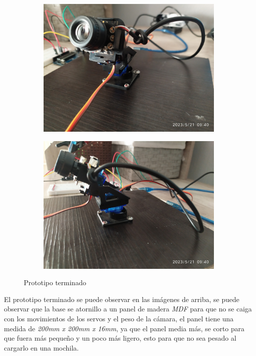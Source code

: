 \documentclass[12pt, oneside]{article}
\begin{document}
{\begin{figure}[h!]
\begin{subfigure}[tr]{0.45\textwidth}
        \end{subfigure}
        \begin{subfigure}[bl]{0.45\textwidth}
            \centering
            \includegraphics[width=\linewidth]{figs/IMG_20230521_094025.jpg}
        \end{subfigure}
        \begin{subfigure}[br]{0.45\textwidth}
            \centering
            \includegraphics[width=\linewidth]{figs/IMG_20230521_094036.jpg}
        \end{subfigure}

        \caption{\sffamily Prototipo terminado}
        \label{fig:prototipo}
    \end{figure}

    \hspace{0.5cm} El prototipo terminado se puede observar en las imágenes de arriba,
    se puede observar que la base se atornillo a un panel de madera \emph{MDF} para que
    no se caiga con los movimientos de los servos y el peso de la cámara, el panel tiene
    una medida de \emph{200mm x 200mm x 16mm}, ya que el panel media más, se corto para
    que fuera más pequeño y un poco más ligero, esto para que no sea pesado al cargarlo
    en una mochila.

}
\end{document}
